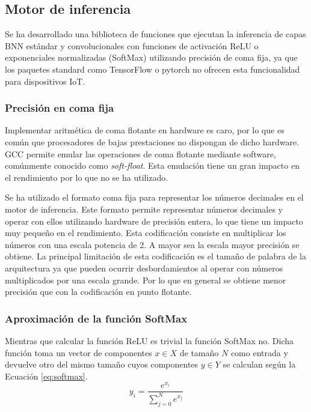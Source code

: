 \subsection{Motor de inferencia} \label{sec:motor_inferencia_c}

Se ha desarrollado una biblioteca de funciones que ejecutan la inferencia de capas BNN estándar y convolucionales con funciones de activación ReLU o exponenciales normalizadas (SoftMax) utilizando precisión de coma fija, ya que los paquetes standard como TensorFlow o pytorch no ofrecen esta funcionalidad para dispositivos IoT. 

\subsubsection{Precisión en coma fija}

Implementar aritmética de coma flotante en hardware es caro, por lo que es común que procesadores de bajas prestaciones no dispongan de dicho hardware. GCC permite emular las operaciones de coma flotante mediante software, comúnmente conocido como \textit{soft-float}. Esta emulación tiene un gran impacto en el rendimiento por lo que no se ha utilizado.

Se ha utilizado el formato coma fija para representar los números decimales en el motor de inferencia. Este formato permite representar números decimales y operar con ellos utilizando hardware de precisión entera, lo que tiene un impacto muy pequeño en el rendimiento. Esta codificación consiste en multiplicar los números con una escala potencia de 2. A mayor sea la escala mayor precisión se obtiene. La principal limitación de esta codificación es el tamaño de palabra de la arquitectura ya que pueden ocurrir desbordamientos al operar con números multiplicados por una escala grande. Por lo que en general se obtiene menor precisión que con la codificación en punto flotante.

\subsubsection{Aproximación de la función SoftMax}

Mientras que calcular la función ReLU es trivial la función SoftMax no. Dicha función toma un vector de componentes $x \in X$ de tamaño $N$ como entrada y devuelve otro del mismo tamaño cuyos componentes $y\in Y$ se calculan según la Ecuación \ref{eq:softmax}.
\begin{equation} \label{eq:softmax}
y_i = \dfrac{e^{x_i}}{\sum_{j = 0}^N e^{x_j}}
\end{equation}

